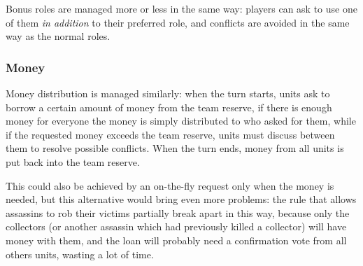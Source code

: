 				Bonus roles are managed more or less in the same way: players can ask to use one of them \emph{in addition} to their preferred role, and conflicts are avoided in the same way as the normal roles.
							
			\subsubsection{Money}
			\label{nolead:money}
				Money distribution is managed similarly: when the turn starts, units ask to borrow a certain amount of money from the team reserve, if there is enough money for everyone the money is simply distributed to who asked for them, while if the requested money exceeds the team reserve, units must discuss between them to resolve possible conflicts.
				When the turn ends, money from all units is put back into the team reserve.
				
				This could also be achieved by an on-the-fly request only when the money is needed, but this alternative would bring even more problems: the rule that allows assassins to rob their victims partially break apart in this way, because only the collectors (or another assassin which had previously killed a collector) will have money with them, and the loan will probably need a confirmation vote from all others units, wasting a lot of time.
		